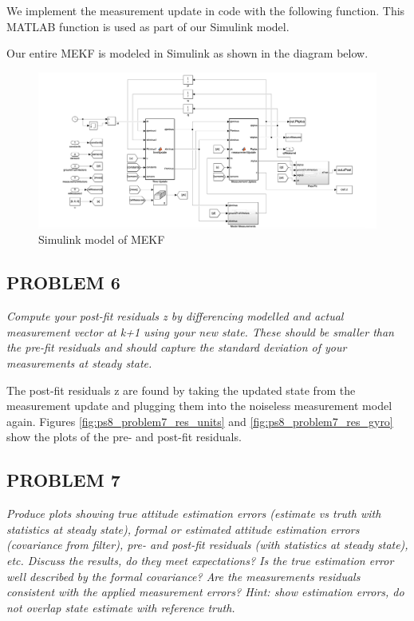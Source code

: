 We implement the measurement update in code with the following function. This MATLAB function is used as part of our Simulink model.



Our entire MEKF is modeled in Simulink as shown in the diagram below.

\begin{figure}[H]
\centering
\includegraphics[scale=0.28]{Images/ps8_problem5_simulink.png}
\caption{Simulink model of MEKF}
\label{fig:ps8_problem5_simulink}
\end{figure}

\subsection{PROBLEM 6}
\textit{Compute your post-fit residuals z by differencing modelled and actual measurement vector at k+1 using your new state. These should be smaller than the pre-fit residuals and should capture the standard deviation of your measurements at steady state.}

The post-fit residuals z are found by taking the updated state from the measurement update and plugging them into the noiseless measurement model again. Figures \ref{fig:ps8_problem7_res_units} and \ref{fig:ps8_problem7_res_gyro} show the plots of the pre- and post-fit residuals.

\subsection{PROBLEM 7}
\textit{Produce plots showing true attitude estimation errors (estimate vs truth with statistics at steady state), formal or estimated attitude estimation errors (covariance from filter), pre- and post-fit residuals (with statistics at steady state), etc. Discuss the results, do they meet expectations? Is the true estimation error well described by the formal covariance? Are the measurements residuals consistent with the applied measurement errors? Hint: show estimation errors, do not overlap state estimate with reference truth.}

